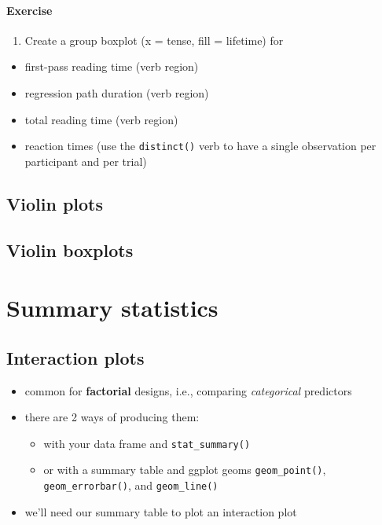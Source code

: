 \documentclass[
  letterpaper,
  DIV=11,
  numbers=noendperiod]{scrartcl}
\let\oldparagraph\paragraph
\renewcommand{\paragraph}[1]{\oldparagraph{#1}\mbox{}}
\providecommand{\tightlist}{%
  \setlength{\itemsep}{0pt}\setlength{\parskip}{0pt}}\usepackage{longtable,booktabs,array}
\begin{document}
\hypertarget{exercise-3}{%
\paragraph{Exercise}\label{exercise-3}}

\begin{enumerate}
\def\labelenumi{\arabic{enumi}.}
\tightlist
\item
  Create a group boxplot (x = tense, fill = lifetime) for
\end{enumerate}

\begin{itemize}
\tightlist
\item
  first-pass reading time (verb region)
\item
  regression path duration (verb region)
\item
  total reading time (verb region)
\item
  reaction times (use the \texttt{distinct()} verb to have a single
  observation per participant and per trial)
\end{itemize}

\hypertarget{violin-plots}{%
\subsection{Violin plots}\label{violin-plots}}

\hypertarget{violin-boxplots}{%
\subsection{Violin boxplots}\label{violin-boxplots}}

\hypertarget{summary-statistics-1}{%
\section{Summary statistics}\label{summary-statistics-1}}

\hypertarget{interaction-plots}{%
\subsection{Interaction plots}\label{interaction-plots}}

\begin{itemize}
\tightlist
\item
  common for \textbf{factorial} designs, i.e., comparing
  \emph{categorical} predictors
\item
  there are 2 ways of producing them:

  \begin{itemize}
  \tightlist
  \item
    with your data frame and \texttt{stat\_summary()}
  \item
    or with a summary table and ggplot geoms \texttt{geom\_point()},
    \texttt{geom\_errorbar()}, and \texttt{geom\_line()}
  \end{itemize}
\item
  we'll need our summary table to plot an interaction plot
\end{itemize}
\end{document}
